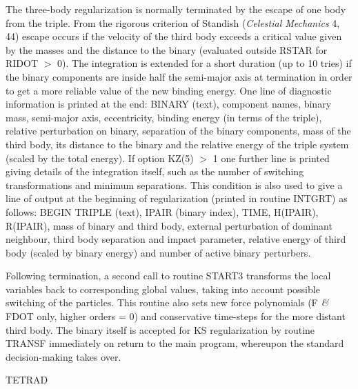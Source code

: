  The three-body regularization is normally terminated by the escape of one body from the triple.  From                     
   the rigorous criterion of Standish ({\it Celestial Mechanics} 4, 44) escape occurs if the velocity of                 
   the third body exceeds a critical value given by the masses and the distance to the binary (evaluated                
   outside RSTAR for RIDOT $>$ 0).  The integration is extended for a short duration (up to                
   10 tries) if the binary components are inside half the semi-major axis at termination in order to                    
   get a more reliable value of the new binding energy.  One line of diagnostic information is                       
   printed at the end:  BINARY (text), component names, binary mass, semi-major axis, eccentricity,                     
   binding energy (in terms of the triple), relative perturbation on binary, separation of the binary                   
   components, mass of the third body, its distance to the binary and the relative energy of the triple                 
   system (scaled by the total energy).  If option KZ(5) $>$ 1 one further line is printed giving details                 
   of the integration itself, such as the number of switching transformations and minimum separations.  This                  
   condition is also used to give a line of output at the beginning of regularization (printed in                  
   routine INTGRT) as follows:  BEGIN TRIPLE (text), IPAIR (binary index), TIME, H(IPAIR), R(IPAIR),                    
   mass of binary and third body, external perturbation of dominant neighbour, third body separation and                
   impact parameter, relative energy of third body (scaled by binary energy) and number of active binary                
   perturbers.                                                                                                          

 Following termination, a second call to routine START3 transforms the local variables back to                   
  corresponding global values, taking into account possible switching of
   the particles.  This routine also sets new force polynomials (F {\it\&} FDOT only, higher orders = 0) and                  
   conservative time-steps for the more distant third body.  The binary itself is accepted for KS                       
   regularization by routine TRANSF immediately on return to the main program, whereupon the standard                   
   decision-making takes over.                                                                                          
\bigskip
\bigskip
\centerline {TETRAD}
\bigskip

